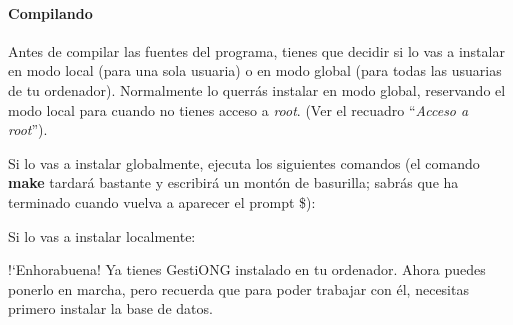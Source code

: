 \bigskip


\bigskip

\paragraph{Compilando}
Antes de compilar las fuentes del programa, tienes que decidir si lo vas
a instalar en modo local (para una sola usuaria) o en modo global (para
todas las usuarias de tu ordenador). Normalmente lo querrás instalar
en modo global, reservando el modo local para cuando no tienes acceso a
\textit{root}. (Ver el recuadro {\textquotedblleft}\textit{Acceso a
root}{\textquotedblright}).

Si lo vas a instalar globalmente, ejecuta los siguientes comandos (el
comando \textbf{make }tardará bastante y escribirá un montón de
basurilla; sabrás que ha terminado cuando vuelva a aparecer el prompt
\$):



\begin{center}
\begin{minipage}{16.48cm}



\end{minipage}
\end{center}

\bigskip


\bigskip

Si lo vas a instalar localmente:



\begin{center}
\begin{minipage}{16.48cm}


\end{minipage}
\end{center}

\bigskip


\bigskip


\bigskip

!`Enhorabuena! Ya tienes GestiONG instalado en tu ordenador. Ahora
puedes ponerlo en marcha, pero recuerda que para poder trabajar con
él, necesitas primero instalar la base de datos.

